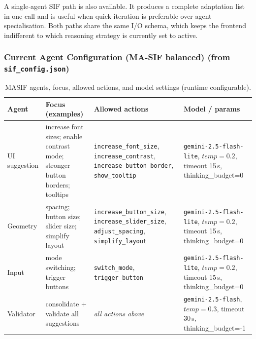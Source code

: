 \documentclass[openany]{book}
\begin{document}
A single‑agent SIF path is also available. It produces a complete adaptation list in one call and is useful when quick iteration is preferable over agent specialisation. Both paths share the same I/O schema, which keeps the frontend indifferent to which reasoning strategy is currently set to active.

\subsubsection*{Current Agent Configuration (MA-SIF balanced) (from \texttt{sif\_config.json})}
\begin{table}[H]
\centering
\begin{tabular}{p{2.1cm}p{4cm}p{4cm}p{4.1cm}}
\toprule
\textbf{Agent} & \textbf{Focus (examples)} & \textbf{Allowed actions} & \textbf{Model / params} \\
\midrule
UI suggestion & increase font sizes; enable contrast mode; stronger button borders; tooltips & \texttt{increase\_font\_size}, \texttt{increase\_contrast}, \texttt{increase\_button\_border}, \texttt{show\_tooltip} & \texttt{gemini-2.5-flash-lite}, $temp{=}0.2$, timeout 15\,s, thinking\_budget=0 \\
Geometry & spacing; button size; slider size; simplify layout & \texttt{increase\_button\_size}, \texttt{increase\_slider\_size}, \texttt{adjust\_spacing}, \texttt{simplify\_layout} & \texttt{gemini-2.5-flash-lite}, $temp{=}0.2$, timeout 15\,s, thinking\_budget=0 \\
Input & mode switching; trigger buttons & \texttt{switch\_mode}, \texttt{trigger\_button} & \texttt{gemini-2.5-flash-lite}, $temp{=}0.2$, timeout 15\,s, thinking\_budget=0 \\
Validator & consolidate + validate all suggestions & \emph{all actions above} & \texttt{gemini-2.5-flash}, $temp{=}0.3$, timeout 30\,s, thinking\_budget=-1 \\
\bottomrule
\end{tabular}
\caption{MA\textendash SIF agents, focus, allowed actions, and model settings (runtime configurable).}
\end{table}
\end{document}
